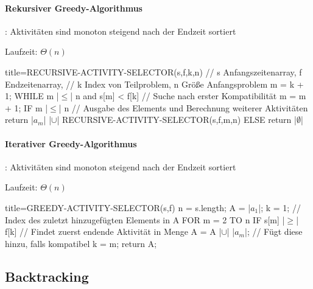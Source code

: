 \documentclass[
    ngerman,
    color=3b,
    load_common, %
    summary,
    boxarc,
]{rubos-tuda-template}
\begin{document}
\paragraph{Rekursiver Greedy-Algorithmus}\mbox{}
\begin{grayInfoBox}
    : Aktivitäten sind monoton steigend nach der Endzeit sortiert
\end{grayInfoBox}
Laufzeit: $\Theta(n)$

\begin{codeBlock}[autogobble,escapeinside=||]{title={RECURSIVE-ACTIVITY-SELECTOR(s,f,k,n)}}
    // s Anfangszeitenarray, f Endzeitenarray, 
    // k Index von Teilproblem, n Grö\ss{}e Anfangsproblem
    m = k + 1;
    WHILE m |$\leq$| n and s[m] < f[k]  // Suche nach erster Kompatibilität
        m = m + 1;
    IF m |$\leq$| n
        // Ausgabe des Elements und Berechnung weiterer Aktivitäten
        return {|$a_m$|} |$\cup$| RECURSIVE-ACTIVITY-SELECTOR(s,f,m,n)
    ELSE
        return |$\emptyset$|
\end{codeBlock}

\paragraph{Iterativer Greedy-Algorithmus}\mbox{}
\begin{grayInfoBox}
    : Aktivitäten sind monoton steigend nach der Endzeit sortiert
\end{grayInfoBox}
Laufzeit: $\Theta(n)$
\begin{codeBlock}[autogobble,escapeinside=||]{title={GREEDY-ACTIVITY-SELECTOR(s,f)}}
    n = s.length;
    A = {|$a_1$|};
    k = 1;          // Index des zuletzt hinzugefügten Elements in A
    FOR m = 2 TO n                      
        IF s[m] |$\geq$| f[k]       // Findet zuerst endende Aktivität in Menge
            A = A |$\cup$| {|$a_m$|};   // Fügt diese hinzu, falls kompatibel
            k = m;
    return A;
\end{codeBlock}

\clearpage
\subsection{Backtracking}
\end{document}
